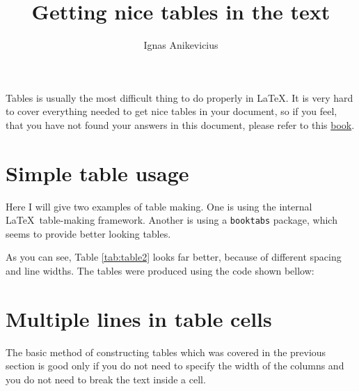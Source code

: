 

\usepackage[]{amsmath}
\usepackage{blindtext}
\usepackage{multicol}
\usepackage[english,british]{babel}

\usepackage{stfloats}
\usepackage{booktabs}
\usepackage{array}

\title{Getting nice tables in the text}
\author{Ignas Anikevicius}



\maketitle

Tables is usually the most difficult thing to do properly in \LaTeX . It is very
hard to cover everything needed to get nice tables in your document, so if you
feel, that you have not found your answers in this document, please refer to
this 
\href{https://secure.wikimedia.org/wikibooks/en/wiki/LaTeX/Tables#The_table_environment_-_captioning_etc}{book}.

\section{Simple table usage}

Here I will give two examples of table making. One is using the internal \LaTeX\
table-making framework. Another is using a \verb|booktabs| package, which seems
to provide better looking tables.




As you can see, Table \ref{tab:table2} looks far better, because of different
spacing and line widths. The tables were produced using the code shown bellow:



\section{Multiple lines in table cells}

The basic method of constructing tables which was covered in the previous
section is good only if you do not need to specify the width of the columns and
you do not need to break the text inside a cell.

